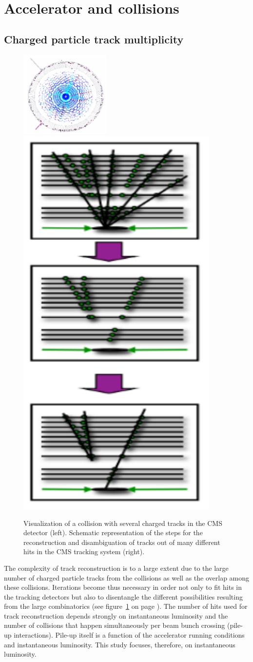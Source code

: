 \documentclass[a4paper]{jpconf}
\begin{document}
\section{Accelerator and collisions}

\subsection{Charged particle track multiplicity}

\begin{figure}[ht]
  \begin{center}
\includegraphics[width=0.4\textwidth]{1.pdf}
\includegraphics[height=0.55\textwidth,angle=90]{2.pdf}
\caption{\label{fig1} Visualization of a collision with several charged tracks in the CMS detector (left). Schematic representation of the steps for the reconstruction and disambiguation of tracks out of many different hits in the CMS tracking system (right).}
  \end{center}
\vspace{-8mm}
\end{figure}

The complexity of track reconstruction is to a large extent due to the large number of charged particle tracks from the collisions as well as the overlap among these collisions. Iterations become thus necessary in order  not only to fit hits in the tracking detectors but also to disentangle the different possibilities resulting from the large combinatorics (see figure~\ref{fig1} on page \pageref{fig1}). The number of hits used for track reconstruction depends strongly on instantaneous luminosity and the number of collisions that happen simultaneously per beam bunch crossing (pile-up interactions). Pile-up itself is a function of the accelerator running conditions and instantaneous luminosity. This study focuses, therefore, on instantaneous luminosity.
\end{document}
